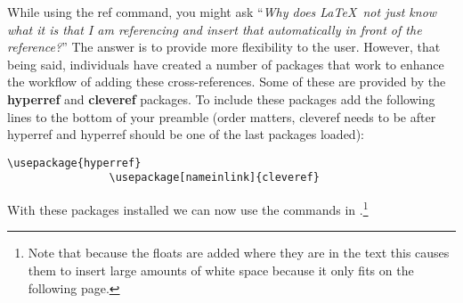 			While using the ref command, you might ask \enquote{\textit{Why does \LaTeX\ not just know what it is that I am referencing and insert that automatically in front of the reference?}}
			The answer is to provide more flexibility to the user.
			However, that being said, individuals have created a number of packages that work to enhance the workflow of adding these cross-references.
			Some of these are provided by the \textbf{hyperref} and \textbf{cleveref} packages.
			To include these packages add the following lines to the bottom of your preamble (order matters, cleveref needs to be after hyperref and hyperref should be one of the last packages loaded):
			\begin{lstlisting}[style=LaTeXStyle]
				\usepackage{hyperref}
				\usepackage[nameinlink]{cleveref}
			\end{lstlisting}
			With these packages installed we can now use the commands in .\footnote{Note that because the floats are added where they are in the text this causes them to insert large amounts of white space because it only fits on the following page.}
